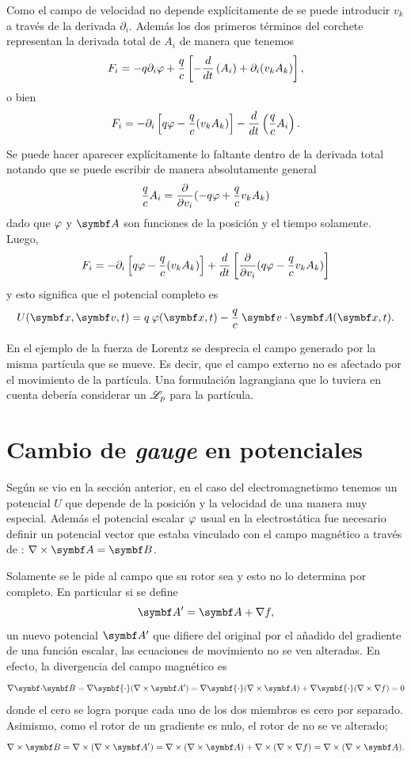 \documentclass[10pt,oneside]{CBFT_book}
\begin{document}
Como el campo de velocidad  no depende explícitamente de  se puede introducir $v_k$ a través de la derivada $\partial_i$. Además los
dos primeros términos del corchete representan la derivada total de $A_i$ de manera que tenemos
\[
	F_i = -q \partial_i \varphi + \frac{q}{c} \left[  - \frac{d^{\hspace{-0.05em}} {}}{d {t}^{\hspace{-0.05em}}} \left(A_i\right)  + \partial_i (v_k A_k)  \right],
\]
o bien 
\[
	F_i = - \partial_i \left[ q\varphi - \frac{q}{c}  (v_k A_k) \right] -  \frac{d^{\hspace{-0.05em}} {}}{d {t}^{\hspace{-0.05em}}} \left( \frac{q}{c} A_i \right).
\]

Se puede hacer aparecer explícitamente lo faltante dentro de la derivada total notando que se puede escribir de manera absolutamente general
\[
	\frac{q}{c} A_i =  \frac{\partial^{\hspace{-0.05em}} {}}{\partial {v_i}^{\hspace{-0.05em}}} ( - q\varphi + \frac{q}{c} v_k A_k )
\]
dado que $\varphi$ y $\vb{A}$ son funciones de la posición y el tiempo solamente. Luego,
\[
	F_i = - \partial_i \left[ q\varphi - \frac{q}{c}  (v_k A_k) \right] + \frac{d^{\hspace{-0.05em}} {}}{d {t}^{\hspace{-0.05em}}} \left[ \frac{\partial^{\hspace{-0.05em}} {}}{\partial {v_i}^{\hspace{-0.05em}}} ( q\varphi - \frac{q}{c} v_k A_k ) \right]
\]
y esto significa que el potencial completo es
\[
	U(\vb{x},\vb{v},t) = q \: \vp(\vb{x},t) - \frac{q}{c} \: \pe{v}{A}(\vb{x},t).
\]

En el ejemplo de la fuerza de Lorentz se desprecia el campo generado por la misma partícula que se mueve. Es decir, 
que el campo externo no es afectado por el movimiento de la partícula.
Una formulación lagrangiana que lo tuviera en cuenta debería considerar un $\mathscr{L}_p$ para la partícula.

\section{Cambio de {\it gauge} en potenciales}

Según se vio en la sección anterior, en el caso del electromagnetismo tenemos un potencial $ U $ que depende de la posición y la velocidad
de una manera muy especial. Además el potencial escalar $ \varphi $ usual en la electrostática fue necesario definir un potencial vector 
que estaba vinculado con el campo magnético  a través de : $\rotorm{A}=\vb{B}$.

Solamente se le pide al campo  que su rotor sea  y esto no lo determina por completo. En particular si se define 
\[
	\vb{A}' = \vb{A} + \nabla f,
\]
un nuevo potencial $\vb{A}'$ que difiere del original por el añadido del gradiente de una función escalar, las ecuaciones de movimiento
no se ven alteradas. En efecto, la divergencia del campo magnético  es
\[
	\divem{B} = \nabla \symbf{\cdot} (\rotorm{A}') = 
	\nabla \symbf{\cdot} (\rotorm{A}) + \nabla \symbf{\cdot} (\nabla \times {\nabla f}) = 0
\]
donde el cero se logra porque cada uno de los dos miembros es cero por separado.
Asimismo, como el rotor de un gradiente es nulo, el rotor de  no se ve alterado;
\[
	\rotorm{B} = \nabla \times( \rotorm{A}' ) =
	\nabla \times( \rotorm{A} ) + \nabla \times ( \nabla \times \nabla f ) =
	\nabla \times( \rotorm{A} ).
\]
\end{document}
